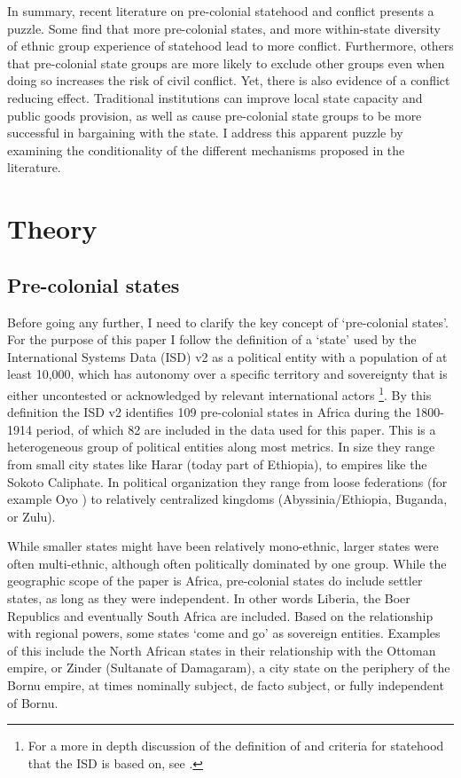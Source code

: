 In summary, recent literature on pre-colonial statehood and conflict presents a
puzzle. Some find that more pre-colonial states, and more within-state diversity
of ethnic group experience of statehood lead to more conflict. Furthermore,
others that pre-colonial state groups are more likely to exclude other groups
even when doing so increases the risk of civil conflict. Yet, there is also
evidence of a conflict reducing effect. Traditional institutions can improve
local state capacity and public goods provision, as well as cause pre-colonial
state groups to be more successful in bargaining with the state. I address this
apparent puzzle by examining the conditionality of the different mechanisms
proposed in the literature.

\section{Theory}
\label{Theory} 

\subsection{Pre-colonial states} \label{Pre-colonial states}

Before going any further, I need to clarify the key concept of `pre-colonial
states'. For the purpose of this paper I follow the definition of a `state' used
by the International Systems Data (ISD) v2 \citep{Butcher2020} as a political
entity with a population of at least 10,000, which has autonomy over a specific
territory and sovereignty that is either uncontested or acknowledged by relevant
international actors \citep{Butcher2020}\footnote{For a more in depth discussion
of the definition of and criteria for statehood that the ISD is based on, see
\citet{Butcher2017}.}. By this definition the ISD v2 identifies 109 pre-colonial
states in Africa during the 1800-1914 period, of which 82 are included in the
data used for this paper. This is a heterogeneous group of political entities
along most metrics. In size they range from small city states like Harar (today
part of Ethiopia), to empires like the Sokoto Caliphate. In political
organization they range from loose federations (for example Oyo \citep{Law1977})
to relatively centralized kingdoms (Abyssinia/Ethiopia, Buganda, or Zulu).

While smaller states might have been relatively mono-ethnic, larger states were
often multi-ethnic, although often politically dominated by one group. While the
geographic scope of the paper is Africa, pre-colonial states do include settler
states, as long as they were independent. In other words Liberia, the Boer
Republics and eventually South Africa are included. Based on the relationship
with regional powers, some states `come and go' as sovereign entities. Examples
of this include the North African states in their relationship with the Ottoman
empire, or Zinder (Sultanate of Damagaram), a city state on the periphery of the
Bornu empire, at times nominally subject, de facto subject, or fully independent
of Bornu.

